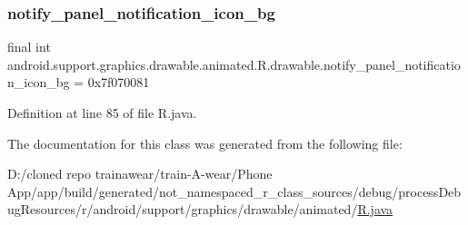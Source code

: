 \mbox{\label{classandroid_1_1support_1_1graphics_1_1drawable_1_1animated_1_1_r_1_1drawable_afd5a7eb941d015ffa1256e11549c45e1}} 
\subsubsection{\texorpdfstring{notify\_panel\_notification\_icon\_bg}{notify\_panel\_notification\_icon\_bg}}
{\footnotesize\ttfamily final int android.\+support.\+graphics.\+drawable.\+animated.\+R.\+drawable.\+notify\+\_\+panel\+\_\+notification\+\_\+icon\+\_\+bg = 0x7f070081\hspace{0.3cm}{\ttfamily [static]}}



Definition at line 85 of file R.\+java.



The documentation for this class was generated from the following file\+:\begin{DoxyCompactItemize}
\item 
D\+:/cloned repo trainawear/train-\/\+A-\/wear/\+Phone App/app/build/generated/not\+\_\+namespaced\+\_\+r\+\_\+class\+\_\+sources/debug/process\+Debug\+Resources/r/android/support/graphics/drawable/animated/\mbox{\hyperlink{process_debug_resources_2r_2android_2support_2graphics_2drawable_2animated_2_r_8java}{R.\+java}}\end{DoxyCompactItemize}
